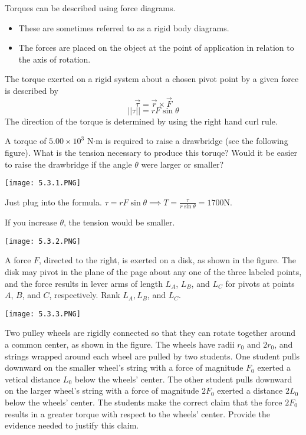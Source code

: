 \documentclass[../mech.tex]{subfiles}
\begin{document}
Torques can be described using force diagrams.
\begin{itemize}
    \item These are sometimes referred to as a rigid body diagrams.
    \item The forces are placed on the object at the point of application in relation to the axis of rotation.
\end{itemize}

The torque exerted on a rigid system about a chosen pivot point by a given force is described by 
\[ \vec{\tau}=\vec{r}\times \vec{F} \]
\[ ||\tau||=rF\sin\theta \]
The direction of the torque is determined by using the right hand curl rule.

\pagebreak
\begin{example}
    A torque of $5.00\times 10^3$ N$\cdot$m is required to raise a drawbridge (see the following figure). What is the tension necessary to produce this toruqe? Would it be easier to raise the drawbridge if the angle $\theta$ were larger or smaller?

    \begin{center}
        \texttt{[image: 5.3.1.PNG]}
    \end{center}

    Just plug into the formula. $\tau = rF\sin\theta \implies T=\frac{\tau}{r\sin\theta}=1700$N.

    If you increase $\theta$, the tension would be smaller.
\end{example}

\ex \begin{center}
    \texttt{[image: 5.3.2.PNG]}
\end{center}
A force $F$, directed to the right, is exerted on a disk, as shown in the figure. The disk may pivot in the plane of the page about any one of the three labeled points, and the force results in lever arms of length $L_A$, $L_B$, and $L_C$ for pivots at points $A$, $B$, and $C$, respectively. 
Rank $L_A,L_B$, and $L_C$.

\pagebreak
\ex \begin{center}
    \texttt{[image: 5.3.3.PNG]}
\end{center}
Two pulley wheels are rigidly connected so that they can rotate together around a common center, as shown in the figure. The wheels have radii $r_0$ and $2r_0$, and strings wrapped around each wheel are pulled by two students.
One student pulls downward on the smaller wheel's string with a force of magnitude $F_0$ exerted a vetical distance $L_0$ below the wheels' center. The other student pulls downward on the larger wheel's string with a force of magnitude 
$2F_0$ exerted a distance $2L_0$ below the wheels' center. The students make the correct claim that the force $2F_0$ results in a greater torque with respect to the wheels' center. Provide the evidence needed to justify this claim.
\end{document}
